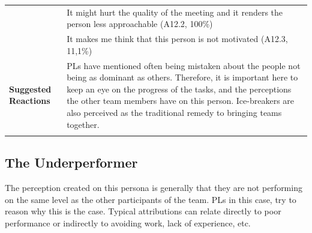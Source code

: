 \begin{longtable}[ht]{ p{}  p{} p{} }
 	 & It might hurt the quality of the meeting and it renders the person less approachable (A12.2, 100\%)\\
 	 & It makes me think that this person is not motivated (A12.3, 11,1\%) \\
    \hline
     \textbf{Suggested Reactions} & \multicolumn{2}{p{.80\textwidth}}{PLs have mentioned often being mistaken about the people not being as dominant as others. Therefore, it is important here to keep an eye on the progress of the tasks, and the perceptions the other team members have on this person. Ice-breakers are also perceived as the traditional remedy to bringing teams together.} \\
    \hline
\label{tab:multicol}
\end{longtable}

\subsection{The Underperformer}

The perception created on this persona is generally that they are not performing on the same level as the other participants of the team. PLs in this case, try to reason why this is the case. Typical attributions can relate directly to poor performance or indirectly to avoiding work, lack of experience, etc.

